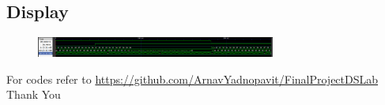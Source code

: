 \documentclass[11pt]{article}
\begin{document}
\subsection{Display}
\begin{figure}[H]
    \centering
    \includegraphics[width=0.7\textwidth]{figs/disptest.png}
\end{figure}
For codes refer to \url{https://github.com/ArnavYadnopavit/FinalProjectDSLab}\\

\centering
Thank You
\end{document}
